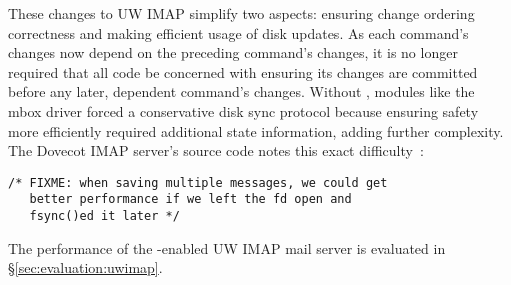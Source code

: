 These changes to UW IMAP simplify two aspects:
%
ensuring change ordering correctness
%
and making efficient usage of disk updates.
%
As each command's changes now depend on the preceding command's
changes, it is no longer required that all code be concerned with
ensuring its changes are committed before any later, dependent
command's changes. Without \opgroups, modules like the mbox driver
forced a conservative disk sync protocol because ensuring safety more
efficiently required additional state information, adding further
complexity. The Dovecot IMAP server's source code notes this exact
difficulty~\cite[maildir-save.c]{dovecot}:

\vspace{-0.5\baselineskip}
\begin{scriptsize}
\begin{verbatim}
/* FIXME: when saving multiple messages, we could get
   better performance if we left the fd open and
   fsync()ed it later */
\end{verbatim}
\end{scriptsize}
\vspace{-0.5\baselineskip}

The performance of the \opgroup{}-enabled UW IMAP mail server is
evaluated in \S\ref{sec:evaluation:uwimap}.
